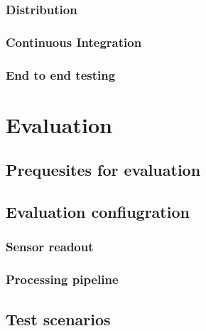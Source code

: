 \hypertarget{distribution}{%
\subsection{Distribution}\label{distribution}}

\hypertarget{continuous-integration}{%
\subsection{Continuous Integration}\label{continuous-integration}}

\hypertarget{end-to-end-testing}{%
\subsection{End to end testing}\label{end-to-end-testing}}

\hypertarget{evaluation}{%
\chapter{Evaluation}\label{evaluation}}

\hypertarget{prequesites-for-evaluation}{%
\section{Prequesites for evaluation}\label{prequesites-for-evaluation}}

\hypertarget{evaluation-confiugration}{%
\section{Evaluation confiugration}\label{evaluation-confiugration}}

\hypertarget{sensor-readout}{%
\subsection{Sensor readout}\label{sensor-readout}}

\hypertarget{processing-pipeline}{%
\subsection{Processing pipeline}\label{processing-pipeline}}

\hypertarget{test-scenarios}{%
\section{Test scenarios}\label{test-scenarios}}

